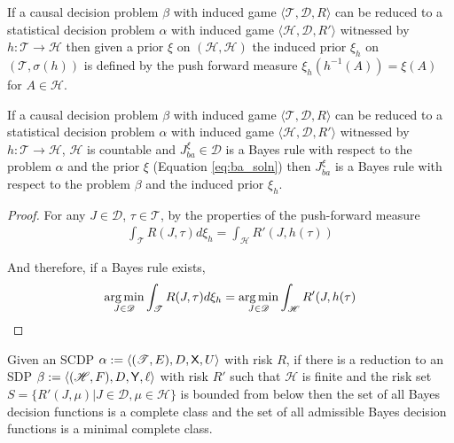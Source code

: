 \begin{definition}
If a causal decision problem $\beta$ with induced game $\langle \mathscr{T},\mathscr{D}, R\rangle$ can be reduced to a statistical decision problem $\alpha$ with induced game $\langle \mathscr{H},\mathscr{D},R' \rangle$ witnessed by $h:\mathscr{T}\to\mathscr{H}$ then given a prior $\xi$ on $(\mathscr{H},\mathcal{H})$ the induced prior $\xi_h$ on $(\mathscr{T},\sigma(h))$ is defined by the push forward measure $\xi_h(h^{-1}(A)) = \xi(A)$ for $A\in \mathcal{H}$.
\end{definition}

\begin{lemma}\label{lem:IB_rule}
If a causal decision problem $\beta$ with induced game $\langle \mathscr{T},\mathscr{D}, R\rangle$ can be reduced to a statistical decision problem $\alpha$ with induced game $\langle \mathscr{H},\mathscr{D},R' \rangle$ witnessed by $h:\mathscr{T}\to\mathscr{H}$, $\mathscr{H}$ is countable and $J_{ba}^\xi\in \mathscr{D}$ is a Bayes rule with respect to the problem $\alpha$ and the prior $\xi$ (Equation \ref{eq:ba_soln}) then $J_{ba}^\xi$ is a Bayes rule with respect to the problem $\beta$ and the induced prior $\xi_h$.
\end{lemma}

\begin{proof}
For any $J\in\mathscr{D}$, $\tau\in \mathscr{T}$, by the properties of the push-forward measure
\begin{align}
    \int_{\mathscr{T}} R(J,\tau) d\xi_h = \int_\mathscr{H} R'(J,h(\tau))
\end{align}

And therefore, if a Bayes rule exists,
\begin{align}
    \operatorname*{arg\,min}_{J\in\mathscr{D}} \int_{\mathscr{T}} R(J,\tau) d\xi_h =  \operatorname*{arg\,min}_{J\in\mathscr{D}}\int_\mathscr{H} R'(J,h(\tau)
\end{align}

\end{proof}

\begin{theorem}
Given an SCDP $\alpha:=\langle (\mathscr{T},E),D,\mathsf{X},U\rangle$ with risk $R$, if there is a reduction to an SDP $\beta:=\langle (\mathscr{H},F),D,\mathsf{Y},\ell \rangle$ with risk $R'$ such that $\mathscr{H}$ is finite and the risk set $S=\{R'(J,\mu)|J\in\mathscr{D},\mu\in \mathscr{H}\}$ is bounded from below then the set of all Bayes decision functions is a complete class and the set of all admissible Bayes decision functions is a minimal complete class.
\end{theorem}

